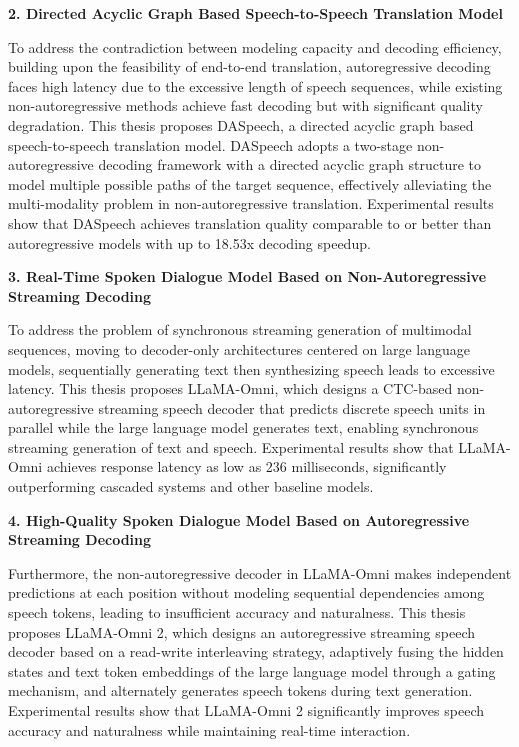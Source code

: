 \textbf{2. Directed Acyclic Graph Based Speech-to-Speech Translation Model}

To address the contradiction between modeling capacity and decoding efficiency, building upon the feasibility of end-to-end translation, autoregressive decoding faces high latency due to the excessive length of speech sequences, while existing non-autoregressive methods achieve fast decoding but with significant quality degradation. This thesis proposes DASpeech, a directed acyclic graph based speech-to-speech translation model. DASpeech adopts a two-stage non-autoregressive decoding framework with a directed acyclic graph structure to model multiple possible paths of the target sequence, effectively alleviating the multi-modality problem in non-autoregressive translation. Experimental results show that DASpeech achieves translation quality comparable to or better than autoregressive models with up to 18.53x decoding speedup.

\textbf{3. Real-Time Spoken Dialogue Model Based on Non-Autoregressive Streaming Decoding}

To address the problem of synchronous streaming generation of multimodal sequences, moving to decoder-only architectures centered on large language models, sequentially generating text then synthesizing speech leads to excessive latency. This thesis proposes LLaMA-Omni, which designs a CTC-based non-autoregressive streaming speech decoder that predicts discrete speech units in parallel while the large language model generates text, enabling synchronous streaming generation of text and speech. Experimental results show that LLaMA-Omni achieves response latency as low as 236 milliseconds, significantly outperforming cascaded systems and other baseline models.

\textbf{4. High-Quality Spoken Dialogue Model Based on Autoregressive Streaming Decoding}

Furthermore, the non-autoregressive decoder in LLaMA-Omni makes independent predictions at each position without modeling sequential dependencies among speech tokens, leading to insufficient accuracy and naturalness. This thesis proposes LLaMA-Omni 2, which designs an autoregressive streaming speech decoder based on a read-write interleaving strategy, adaptively fusing the hidden states and text token embeddings of the large language model through a gating mechanism, and alternately generates speech tokens during text generation. Experimental results show that LLaMA-Omni 2 significantly improves speech accuracy and naturalness while maintaining real-time interaction.

